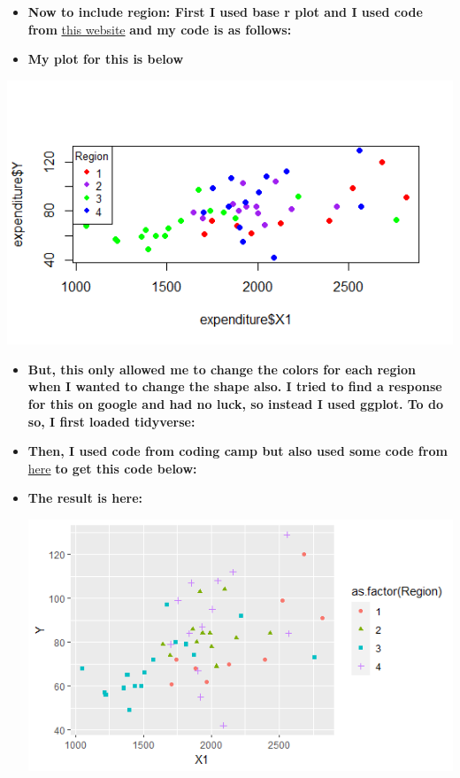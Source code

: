 \documentclass[12pt,letterpaper]{article}
\begin{document}
\begin{itemize}
\begin{itemize}
	
	
	\item \textbf{Now to include region: First I used base r plot and I used code from} \href{https://hbctraining.github.io/Intro-to-R/lessons/basic_plots_in_r.html#:~:text=Basic%20plots%20in%20R,function%20for%20plotting%20x%2Dy%20data.}{this website} 
	\textbf{and my code is as follows:}
	
		
		
	\item \textbf{My plot for this is below}
	
\end{itemize}

 \includegraphics[width=.8\textwidth]{base_r_reg_x1_y}\hfill
 
 \begin{itemize}
 	\item \textbf{But, this only allowed me to change the colors for each region when I wanted to change the shape also. I tried to find a response for this on google and had no luck, so instead I used ggplot. To do so, I first loaded tidyverse:}
 	
 		
 		
 	\item \textbf{Then, I used code from coding camp but also used some code from} \href{https://sscc.wisc.edu/sscc/pubs/dvr/three-variables.html}{here} \textbf{to get this code below:}
 	
 		
 		
 	\item \textbf{The result is here:}
 	
 	\includegraphics[width=.8\textwidth]{ggplot_reg_x1_y}\hfill
 	
 \end{itemize}


\end{itemize}
\end{document}
